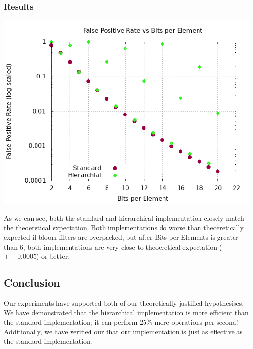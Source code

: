 \subsubsection{Results}
\begin{center}
    \includegraphics[width=14cm]{plots/fp.png}
\end{center}

As we can see, both the standard and hierarchical implementation closely match the theoeretical expectation. 
Both implementations do worse than theoeretically expected if bloom filters are overpacked, but after Bits per Elements is greater than 6, both implementations are very close to theoeretical expectation ($\pm -0.0005$) or better.

\subsection{Conclusion}
Our experiments have supported both of our theoretically justified hypothesises.
We have demonstrated that the hierarchical implementation is more efficient than the standard implementation; it can perform $25\%$ more operations per second!
Additionally, we have verified our that our implementation is just as effective as the standard implementation. 
